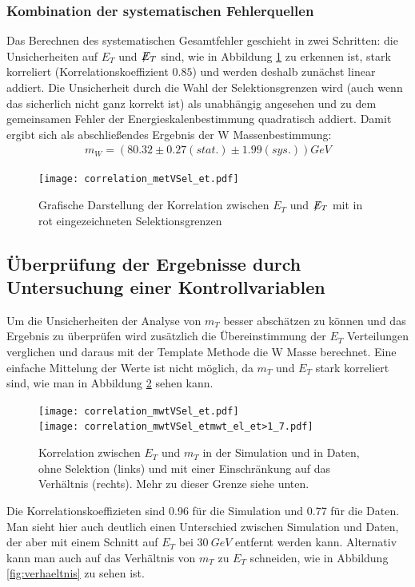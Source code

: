 \documentclass[a4paper,12pt]{article}
\newcommand{\met}{\ensuremath{\not\mathrel{E}}_T}
\begin{document}
\subsubsection*{Kombination der systematischen Fehlerquellen}
Das Berechnen des systematischen Gesamtfehler geschieht in zwei Schritten:
die Unsicherheiten auf $E_{T}$ und $\met$ sind, wie in Abbildung \ref{fig:etVSmet} zu erkennen ist, stark korreliert (Korrelationskoeffizient $0.85$)
und werden deshalb zunächst linear addiert. Die Unsicherheit durch die Wahl der Selektionsgrenzen wird (auch wenn das sicherlich nicht ganz korrekt ist)
als unabhängig angesehen und zu dem gemeinsamen Fehler der Energieskalenbestimmung quadratisch addiert. Damit ergibt sich als abschließendes Ergebnis der
W Massenbestimmung:
\begin{align*}
	m_W = ( 80.32 ± 0.27 (stat.) ± 1.99(sys.)) \si{GeV}
\end{align*}
\begin{figure}[htb]
	\centering
	\texttt{[image: correlation\_metVSel\_et.pdf]}
	\caption{Grafische Darstellung der Korrelation zwischen $E_{T}$ und $\met$ mit in rot eingezeichneten Selektionsgrenzen}
	\label{fig:etVSmet}
\end{figure}

\FloatBarrier
\subsection{Überprüfung der Ergebnisse durch Untersuchung einer Kontrollvariablen}
Um die Unsicherheiten der Analyse von $m_{T}$ besser abschätzen zu können und das Ergebnis zu überprüfen wird zusätzlich
die Übereinstimmung der $E_T$ Verteilungen verglichen und daraus mit der Template Methode die W Masse
berechnet. Eine einfache Mittelung der Werte ist nicht möglich, da $m_T$ und $E_T$ stark korreliert
sind, wie man in Abbildung \ref{fig:correlation} sehen kann.
\begin{figure}[htb]
	\centering
	\texttt{[image: correlation\_mwtVSel\_et.pdf]}\\
	\texttt{[image: correlation\_mwtVSel\_etmwt\_el\_et>1\_7.pdf]}
	\caption{Korrelation zwischen $E_T$ und $m_T$ in der Simulation und in Daten, ohne Selektion
	(links) und mit einer Einschränkung auf das Verhältnis (rechts). Mehr zu dieser Grenze siehe
	unten.}
	\label{fig:correlation}
\end{figure}

Die Korrelationskoeffizieten sind 0.96 für die Simulation und 0.77 für die Daten. Man sieht hier
auch deutlich einen Unterschied  zwischen Simulation und Daten, der aber mit einem Schnitt auf $E_T$ bei
$\SI{30}{GeV}$ entfernt werden kann. Alternativ kann man auch auf das Verhältnis von $m_T$ zu $E_T$
schneiden, wie in Abbildung \ref{fig:verhaeltnis} zu sehen ist.
\end{document}
